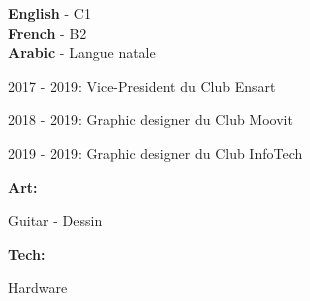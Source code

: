 \documentclass[10pt]{developercv} %
\begin{document}

\begin{minipage}[t]{0.24\textwidth}
	\vspace{-\baselineskip} %

	
	\textbf{English} - C1\\
	\textbf{French} - B2\\
	\textbf{Arabic} - Langue natale\\
\end{minipage}
\hfill
\begin{minipage}[t]{0.5\textwidth}
	\vspace{-\baselineskip} %


    {2017 - 2019: Vice-President du Club Ensart}

	{2018 - 2019: Graphic designer du Club Moovit}

    {2019 - 2019: Graphic designer du Club InfoTech}

\end{minipage}
\hfill
\begin{minipage}[t]{0.2\textwidth}
	\vspace{-\baselineskip} 

	
	\textbf{Art:}

	{Guitar  - Dessin}

    \textbf{Tech:}

    {Hardware}

\end{minipage}
\end{document}
